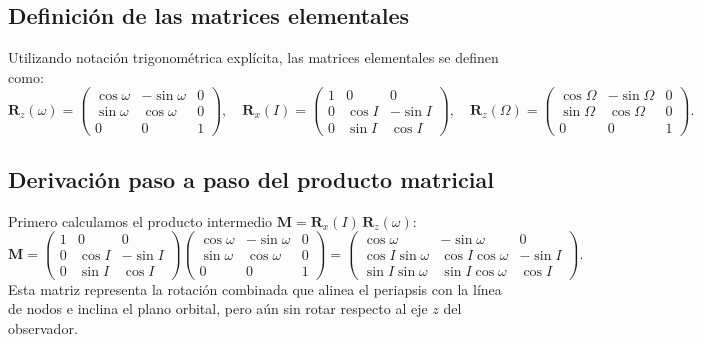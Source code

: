 \subsection{Definición de las matrices elementales}
Utilizando notación trigonométrica explícita, las matrices elementales se definen como:
\[
\mathbf{R}_z(\omega) =
\begin{pmatrix}
\cos\omega & -\sin\omega & 0 \\
\sin\omega & \cos\omega & 0 \\
0 & 0 & 1
\end{pmatrix}, \quad
\mathbf{R}_x(I) =
\begin{pmatrix}
1 & 0 & 0 \\
0 & \cos I & -\sin I \\
0 & \sin I & \cos I
\end{pmatrix}, \quad
\mathbf{R}_z(\Omega) =
\begin{pmatrix}
\cos\Omega & -\sin\Omega & 0 \\
\sin\Omega & \cos\Omega & 0 \\
0 & 0 & 1
\end{pmatrix}.
\]

\subsection{Derivación paso a paso del producto matricial}
Primero calculamos el producto intermedio $\mathbf{M} = \mathbf{R}_x(I)\,\mathbf{R}_z(\omega)$:
\[
\mathbf{M} =
\begin{pmatrix}
1 & 0 & 0 \\
0 & \cos I & -\sin I \\
0 & \sin I & \cos I
\end{pmatrix}
\begin{pmatrix}
\cos\omega & -\sin\omega & 0 \\
\sin\omega & \cos\omega & 0 \\
0 & 0 & 1
\end{pmatrix}
=
\begin{pmatrix}
\cos\omega & -\sin\omega & 0 \\
\cos I \sin\omega & \cos I \cos\omega & -\sin I \\
\sin I \sin\omega & \sin I \cos\omega & \cos I
\end{pmatrix}.
\]
Esta matriz representa la rotación combinada que alinea el periapsis con la línea de nodos e inclina el plano orbital, pero aún sin rotar respecto al eje $z$ del observador.

